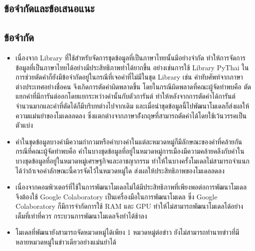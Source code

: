 \documentclass[12pt,oneside,openright,a4paper]{cpe-thai-project}
\begin{document}
\begin{itemize}
\begin{enumerate}
\section{ข้อจำกัดและข้อเสนอแนะ}
  \subsection{ข้อจำกัด}
    \begin{itemize}
      \item เนื่องจาก Library ที่ใช้สำหรับจัดการชุดข้อมูลที่เป็นภาษาไทยนั้นมีอย่างจำกัด ทำให้การจัดการข้อมูลที่เป็นภาษาไทยได้อย่างมีประสิทธิภาพทำได้ยากขึ้น
            อย่างเช่นการใช้ Library PyThai ในการช่วยตัดคำก็ยังมีข้อจำกัดอยู่ในกรณีที่เจอคำที่ไม่มีในชุด Library เช่น คำทับศัพท์จากภาษาต่างประเทศอย่างชื่อคน
            จึงเกิดการตัดคำผิดพลาดขึ้น โดยในกรณีผิดพลาดที่คณะผู้จัดทำพบคือ ตัดแยกคำที่มีการันต์ออกโดยแยกระหว่างคำนั้นกับตัวการันต์ 
            ทำให้หลังจากการตัดคำได้การันต์จำนวนมากและคำที่ตัดได้ก็มีบริบทต่างไปจากเดิม และเมื่อนำชุดข้อมูลนี้ไปพัฒนาโมเดลก็ส่งผลให้ความแม่นยำของโมเดลลดลง 
            ซึ่งแตกต่างจากภาษาอัังกฤษที่สามารถตัดคำได้โดยใช้เว้นวรรคเป็นตัวแบ่ง
      \item คำในชุดข้อมูลบางคำมีความกำกวมหรือคำบางคำในแต่ละหมวดหมู่ก็มีลักษณะของคำที่คล้ายกัน กรณีที่คณะผู้จัดทำพบคือ 
            คำในบางชุดข้อมูลที่อยู่ในหมวดหมู่การเมืองมีความคล้ายคลึงกับคำในบางชุดข้อมูลที่อยู่ในหมวดหมู่เศรษฐกิจและอาชญากรรม 
            ทำให้ในบางครั้งโมเดลไม่สามารถจำแนกได้ว่าถ้าเจอคำลักษณะนี้ควรจัดไว้ในหมวดหมู่ใด ส่งผลให้ประสิทธิภาพของโมเดลลดลง
      \item เนื่องจากคอมพิวเตอร์ที่ใช้ในการพัฒนาโมเดลไม่ได้มีประสิทธิภาพที่เพียงพอต่อการพัฒนาโมเดล จึงต้องใช้ Google Colaboratory เป็นเครื่องมือในการพัฒนาโมเดล
            ซึ่ง Google Colaboratory ก็มีการจำกัดการใช้ RAM และ GPU ทำให้ไม่สามารถพัฒนาโมเดลได้อย่างเต็มที่เท่าที่ควร กระบวนการพัฒนาโมเดลจึงทำได้ช้าลง
      \item โมเดลที่พัฒนายังสามารถจัดหมวดหมู่ได้เพียง 1 หมวดหมู่ต่อข่าว ยังไม่สามารถทำนายข่าวที่มีหลายหมวดหมู่ในข่าวเดียวอย่างแม่นยำได้
    \end{itemize}

\end{enumerate}
\end{itemize}
\end{document}

